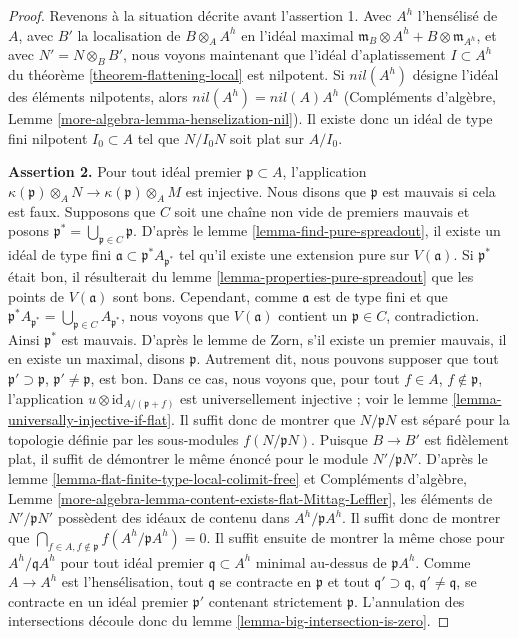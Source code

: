 \begin{proof}
\medskip\noindent
Revenons à la situation décrite avant l'assertion 1. Avec
$A^h$ l'hensélisé de $A$, avec $B'$ la localisation
de $B \otimes_A A^h$ en l'idéal maximal
$\mathfrak m_B \otimes A^h + B \otimes \mathfrak m_{A^h}$, et avec
$N' = N \otimes_B B'$, nous voyons maintenant que l'idéal d'aplatissement $I \subset A^h$
du théorème \ref{theorem-flattening-local} est nilpotent.
Si $nil(A^h)$ désigne l'idéal des éléments nilpotents, alors
$nil(A^h) = nil(A) A^h$
(Compléments d'algèbre, Lemme \ref{more-algebra-lemma-henselization-nil}).
Il existe donc un idéal de type fini
nilpotent $I_0 \subset A$ tel que $N/I_0N$ soit plat sur $A/I_0$.

\medskip\noindent
{\bf Assertion 2.} Pour tout idéal premier $\mathfrak p \subset A$,
l'application
$\kappa(\mathfrak p) \otimes_A N \to \kappa(\mathfrak p) \otimes_A M$
est injective. Nous disons que $\mathfrak p$ est mauvais si cela est faux.
Supposons que $C$ soit une chaîne non vide de premiers mauvais et posons
$\mathfrak p^* = \bigcup_{\mathfrak p \in C} \mathfrak p$.
D'après le lemme \ref{lemma-find-pure-spreadout},
il existe un idéal de type fini
$\mathfrak a \subset \mathfrak p^*A_{\mathfrak p^*}$
tel qu'il existe une extension pure sur $V(\mathfrak a)$.
Si $\mathfrak p^*$ était bon, il résulterait du
lemme \ref{lemma-properties-pure-spreadout}
que les points de $V(\mathfrak a)$ sont bons.
Cependant, comme $\mathfrak a$ est de type fini et que
$\mathfrak p^*A_{\mathfrak p^*} = \bigcup_{\mathfrak p \in C}A_{\mathfrak p^*}$,
nous voyons que $V(\mathfrak a)$ contient un $\mathfrak p \in C$, contradiction.
Ainsi $\mathfrak p^*$ est mauvais. D'après le lemme de Zorn, s'il existe un
premier mauvais, il en existe un maximal, disons $\mathfrak p$.
Autrement dit, nous pouvons supposer que tout $\mathfrak p' \supset \mathfrak p$,
$\mathfrak p' \not = \mathfrak p$, est bon.
Dans ce cas, nous voyons que, pour tout $f \in A$, $f \not \in \mathfrak p$,
l'application $u \otimes \text{id}_{A/(\mathfrak p + f)}$ est universellement
injective ; voir le lemme \ref{lemma-universally-injective-if-flat}.
Il suffit donc de montrer que $N/\mathfrak p N$ est séparé
pour la topologie définie par les sous-modules $f(N/\mathfrak pN)$.
Puisque $B \to B'$ est fidèlement plat, il suffit de démontrer le
même énoncé pour le module $N'/\mathfrak p N'$.
D'après le lemme \ref{lemma-flat-finite-type-local-colimit-free} et
Compléments d'algèbre, Lemme
\ref{more-algebra-lemma-content-exists-flat-Mittag-Leffler},
les éléments de $N'/\mathfrak pN'$ possèdent des idéaux de contenu dans $A^h/\mathfrak pA^h$.
Il suffit donc de montrer que
$\bigcap_{f \in A, f \not \in \mathfrak p} f(A^h/\mathfrak p A^h) = 0$.
Il suffit ensuite de montrer la même chose pour
$A^h/\mathfrak q A^h$ pour tout idéal premier $\mathfrak q \subset A^h$
minimal au-dessus de $\mathfrak p A^h$. Comme $A \to A^h$ est l'hensélisation,
tout $\mathfrak q$ se contracte en $\mathfrak p$ et tout
$\mathfrak q' \supset \mathfrak q$, $\mathfrak q' \not = \mathfrak q$,
se contracte en un idéal premier $\mathfrak p'$ contenant strictement $\mathfrak p$.
L'annulation des intersections découle donc du
lemme \ref{lemma-big-intersection-is-zero}.


\end{proof}
